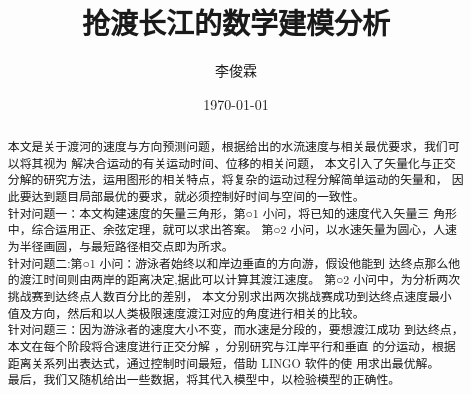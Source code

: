 \documentclass{article}
\title{抢渡长江的数学建模分析}
\author{李俊霖}
\date{\today}
\begin{document}
\maketitle

\begin{abstract}
本文是关于渡河的速度与方向预测问题，根据给出的水流速度与相关最优要求，我们可以将其视为
解决合运动的有关运动时间、位移的相关问题，
本文引入了矢量化与正交分解的研究方法，运用图形的相关特点，将复杂的运动过程分解简单运动的矢量和，
因此要达到题目局部最优的要求，就必须控制好时间与空间的一致性。
\\ \indent 针对问题一：本文构建速度的矢量三角形，第○1 小问，将已知的速度代入矢量三
角形中，综合运用正、余弦定理，就可以求出答案。
第○2 小问，以水速矢量为圆心，人速为半径画圆，与最短路径相交点即为所求。
\\ \indent 针对问题二:第○1 小问：游泳者始终以和岸边垂直的方向游，假设他能到
达终点那么他的渡江时间则由两岸的距离决定,据此可以计算其渡江速度。
第○2 小问中，为分析两次挑战赛到达终点人数百分比的差别，
本文分别求出两次挑战赛成功到达终点速度最小
值及方向，然后和以人类极限速度渡江对应的角度进行相关的比较。
\\ \indent 针对问题三：因为游泳者的速度大小不变，而水速是分段的，要想渡江成功
到达终点，本文在每个阶段将合速度进行正交分解 ，分别研究与江岸平行和垂直
的分运动，根据距离关系列出表达式，通过控制时间最短，借助 LINGO 软件的使
用求出最优解。
\\ \indent 最后，我们又随机给出一些数据，将其代入模型中，以检验模型的正确性。
\\
\\ 
\end{abstract}
\end{document}

